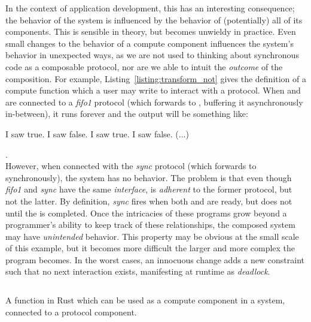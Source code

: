 In the context of application development, this has an interesting consequence; the behavior of the system is influenced by the behavior of (potentially) all of its components. This is sensible in theory, but becomes unwieldy in practice. Even small changes to the behavior of a compute component influences the system's behavior in unexpected ways, as we are not used to thinking about synchronous code as a composable protocol, nor are we able to intuit the \textit{outcome} of the composition. For example, Listing~\ref{listing:transform_not} gives the definition of a compute function which a user may write to interact with a protocol. When  and  are connected to a \textit{fifo1} protocol (which forwards  to , buffering it asynchronously in-between), it runs forever and the output will be something like:
\begin{verb}
	I saw true. I saw false. I saw true. I saw false. (...)
\end{verb}.\\However, when connected with the \textit{sync} protocol (which forwards  to  synchronously), the system has no behavior. The problem is that even though \textit{fifo1} and \textit{sync} have the same \textit{interface},  is \textit{adherent} to the former protocol, but not the latter. By definition, \textit{sync} fires when both  and  are ready, but  does not  until the  is completed. Once the intricacies of these programs grow beyond a programmer's ability to keep track of these relationships, the composed system may have \textit{unintended} behavior. This property may be obvious at the small scale of this example, but it becomes more difficult the larger and more complex the program becomes. In the worst cases, an innocuous change adds a new constraint such that no next interaction exists, manifesting at runtime as \textit{deadlock}. 


\begin{listing}[ht]
	\inputminted[]{rust}{transform_not.rs}
	\caption[Rust example of a compute component.]{A function in Rust which can be used as a compute component in a system, connected to a protocol component.}
	\label{listing:transform_not}
\end{listing}


%
%

